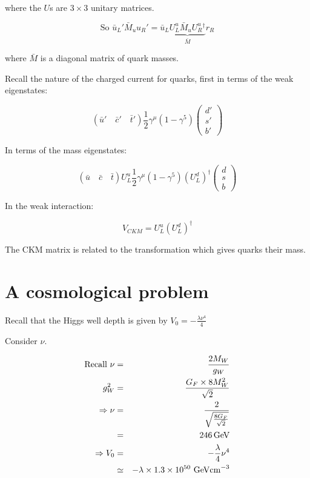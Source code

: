 where the $U$s are $3 \times 3$ unitary matrices.

\[
  \textrm{So } \bar{u}_L' \bar{M}_uu_R' = \bar{u}_L \underbrace{U^u_L \bar{M}_u U^u_R{}^{\dagger}}_{\bar{M}}r_R
\]

where $\bar{M}$ is a diagonal matrix of quark masses.

Recall the nature of the charged current for quarks, first in terms of the weak eigenstates:

\[
  \left( \bar{u}' \quad \bar{c}' \quad \bar{t}' \right)
  \frac{1}{2}\gamma^{\mu}\left(1 - \gamma^5\right)
  \left(
  \begin{array}{c}
    d' \\
    s' \\
    b'
  \end{array}
  \right)
\]

In terms of the mass eigenstates:

\[
  \left( \bar{u} \quad \bar{c} \quad \bar{t} \right)
  U^u_L \frac{1}{2}\gamma^{\mu}\left(1 - \gamma^5\right) \left(U^d_L\right)^{\dagger}
  \left(
  \begin{array}{c}
    d \\
    s \\
    b
  \end{array}
  \right)
\]

In the weak interaction:

\[
  V_{CKM} = U^u_L\left(U^d_L\right)^{\dagger}
\]

The CKM matrix is related to the transformation which gives quarks their mass.

\section{A cosmological problem}

Recall that the Higgs well depth is given by $V_0 = -\frac{\lambda \nu^4}{4}$

Consider $\nu$.

\begin{eqnarray*}
  \textrm{Recall }\nu & = & \frac{2M_W}{g_W} \\
  g_W^2 & = & \frac{G_F \times 8M_W^2}{\sqrt{2}} \\
  \Rightarrow \nu & =& \frac{2}{\sqrt{\frac{8G_F}{\sqrt{2}}}} \\
  & = & 246 \mathrm{\,GeV} \\
  \Rightarrow V_0 & = & -\frac{\lambda}{4}\nu^4 \\
  & \simeq & -\lambda \times 1.3 \times 10^{50}\mathrm{\,\mathrm{\,GeV} cm}^{-3}
\end{eqnarray*}


